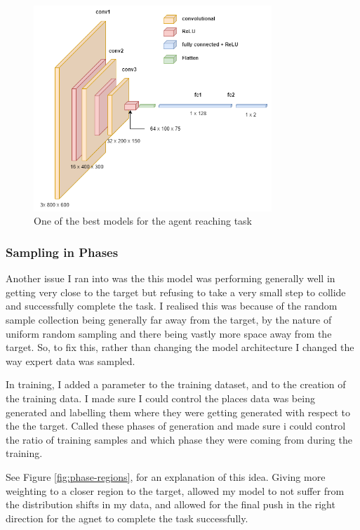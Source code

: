 \begin{figure}[h]
  \centering
  \includegraphics[width=0.8\textwidth]{assets/early-work/cnn-diagram.png}
  \caption{One of the best models for the agent reaching task}\label{fig:cnn-5050}
\end{figure}

\subsubsection{Sampling in Phases}
Another issue I ran into was the this model was performing generally well in getting very close to the target but refusing to take a very small step to collide and successfully complete the task. I realised this was because of the random sample collection being generally far away from the target, by the nature of uniform random sampling and there being vastly more space away from the target. So, to fix this, rather than changing the model architecture I changed the way expert data was sampled.

In training, I added a parameter to the training dataset, and to the creation of the training data. I made sure I could control the places data was being generated and labelling them where they were getting generated with respect to the the target. Called these phases of generation and made sure i could control the ratio of training samples and which phase they were coming from during the training. 

See Figure \ref{fig:phase-regions}, for an explanation of this idea. Giving more weighting to a closer region to the target, allowed my model to not suffer from the distribution shifts in my data, and allowed for the final push in the right direction for the agnet to complete the task successfully.

